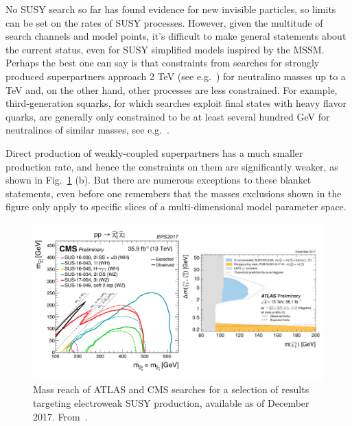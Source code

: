 No SUSY search so far has found evidence for new invisible particles, so limits can be set on the rates of SUSY processes. However, given the multitude of search channels and model points, it's difficult to make general statements about the current status, even for SUSY simplified models inspired by the MSSM. Perhaps the best one can say is that constraints from searches for strongly produced superpartners approach 2 TeV (see e.g.~\cite{Aaboud:2017bac,Sirunyan:2017yse}) for neutralino masses up to a TeV and, 
on the other hand, other processes are less constrained. For example, third-generation squarks, for which searches exploit final states with heavy flavor quarks, are generally only constrained to be at least several hundred GeV for neutralinos of similar masses, see e.g.~\cite{Sirunyan:2017wif,Aaboud:2016wna}.


Direct production of weakly-coupled superpartners has a much smaller production rate, and hence the constraints on them are significantly weaker, as shown in Fig.~\ref{fig:SUSYSummary_ew} (b). But there are numerous exceptions to these blanket statements, even before one remembers that the masses exclusions shown in the figure only apply to specific slices of a multi-dimensional model parameter space.

\begin{figure}[!htpb]
\includegraphics[width=\textwidth]{figures/SUSY_electroweak.pdf}
\caption{Mass reach of ATLAS and CMS searches for a selection of results targeting electroweak SUSY production, available as of December 2017. From~\cite{ATLASSUSYSummary,CMSSUSYSummary}.\label{fig:SUSYSummary_ew}}
\end{figure}

